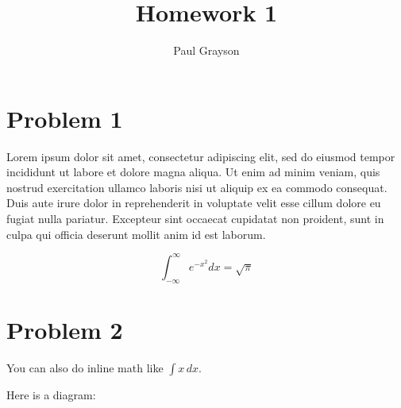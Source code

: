 \documentclass[12pt]{article}
\begin{document}
\title{Homework 1}
\author{Paul Grayson}
\maketitle

\section*{Problem 1}

Lorem ipsum dolor sit amet, consectetur adipiscing elit, sed do eiusmod tempor incididunt ut labore et dolore magna aliqua. Ut enim ad minim veniam, quis nostrud exercitation ullamco laboris nisi ut aliquip ex ea commodo consequat. Duis aute irure dolor in reprehenderit in voluptate velit esse cillum dolore eu fugiat nulla pariatur. Excepteur sint occaecat cupidatat non proident, sunt in culpa qui officia deserunt mollit anim id est laborum.

$$\int_{-\infty}^\infty e^{-x^2} dx = \sqrt{\pi}$$

\section*{Problem 2}

You can also do inline math like $\int x\,dx$.

\noindent Here is a diagram:

\end{document}
